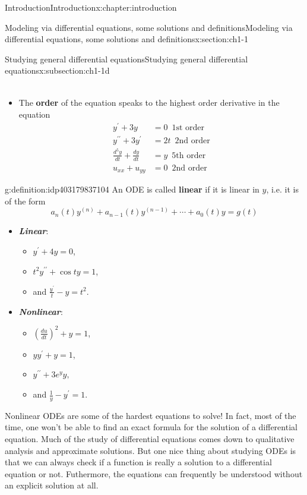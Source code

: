 \documentclass[oneside,10pt,]{book}
\newcommand{\alert}[1]{\textbf{\textit{#1}}}
\newcommand{\terminology}[1]{\textbf{#1}}
\numberwithin{equation}{section}
\numberwithin{equation}{section}
\newcommand{\amp}{&}
\begin{document}
\begin{chapterptx}{Introduction}{}{Introduction}{}{}{x:chapter:introduction}
\begin{sectionptx}{Modeling via differential equations, some solutions and definitions}{}{Modeling via differential equations, some solutions and definitions}{}{}{x:section:ch1-1}
\begin{subsectionptx}{Studying general differential equations}{}{Studying general differential equations}{}{}{x:subsection:ch1-1d}
\begin{itemize}[label=\textbullet]
\begin{align*}
\end{align*}
%
\item{}The \terminology{order} of the equation speaks to the highest order derivative in the equation%
\begin{align*}
y^{\prime}+3y \amp =0\,\,\,\text{1st order}\\
y^{\prime\prime}+3y^{\prime} \amp =2t\,\,\,\text{2nd order}\\
\frac{d^{5}y}{dt}+\frac{dy}{dt} \amp =y\,\,\,\text{5th order}\\
u_{xx}+u_{yy} \amp =0\,\,\,\text{2nd order}
\end{align*}
%
\end{itemize}
\begin{definition}{}{g:definition:idp403179837104}%
An ODE is called \terminology{linear} if it is linear in \(y\), i.e. it is of the form%
\begin{equation*}
a_{n}(t)y^{(n)}+a_{n-1}(t)y^{(n-1)}+\cdots+a_{0}(t)y=g(t)
\end{equation*}
\end{definition}
%
\begin{itemize}[label=\textbullet]
\item{}\alert{Linear}:%
\begin{itemize}[label=$\circ$]
\item{}\(y^{\prime}+4y=0\),%
\item{}\(t^{2}y^{\prime\prime}+\cos ty=1\),%
\item{}and \(\frac{y^{\prime}}{t}-y=t^{2}\).%
\end{itemize}
%
\item{}\alert{Nonlinear}:%
\begin{itemize}[label=$\circ$]
\item{}\(\left(\frac{du}{dt}\right)^{2}+y=1\),%
\item{}\(yy^{\prime}+y=1\),%
\item{}\(\displaystyle y^{\prime\prime}+3e^{y}y,\)%
\item{}and \(\frac{1}{y}-y^{\prime}=1\).%
\end{itemize}
%
\end{itemize}
Nonlinear ODEs are some of the hardest equations to solve! In fact, most of the time, one won't be able to find an exact formula for the solution of a differential equation. Much of the study of differential equations comes down to qualitative analysis and approximate solutions. But one nice thing about studying ODEs is that we can always check if a function is really a solution to a differential equation or not. Futhermore, the equations can frequently be understood without an explicit solution at all.%

\end{subsectionptx}
\end{sectionptx}
\end{chapterptx}
\end{document}
